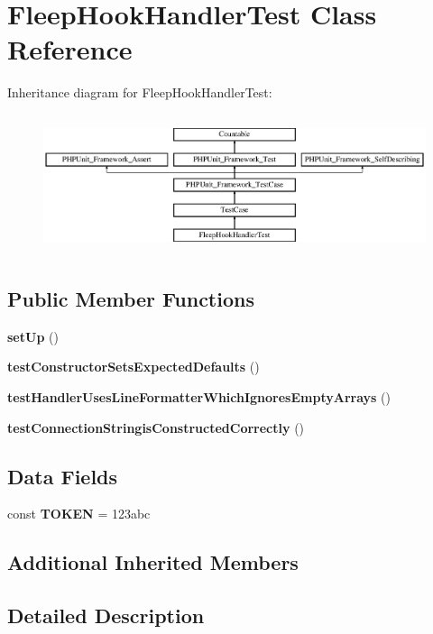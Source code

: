 \section{Fleep\+Hook\+Handler\+Test Class Reference}
\label{class_monolog_1_1_handler_1_1_fleep_hook_handler_test}
Inheritance diagram for Fleep\+Hook\+Handler\+Test\+:\begin{figure}[H]
\begin{center}
\leavevmode
\includegraphics[height=4.129793cm]{class_monolog_1_1_handler_1_1_fleep_hook_handler_test}
\end{center}
\end{figure}
\subsection*{Public Member Functions}
\begin{DoxyCompactItemize}
\item 
{\bf set\+Up} ()
\item 
{\bf test\+Constructor\+Sets\+Expected\+Defaults} ()
\item 
{\bf test\+Handler\+Uses\+Line\+Formatter\+Which\+Ignores\+Empty\+Arrays} ()
\item 
{\bf test\+Connection\+Stringis\+Constructed\+Correctly} ()
\end{DoxyCompactItemize}
\subsection*{Data Fields}
\begin{DoxyCompactItemize}
\item 
const {\bf T\+O\+K\+E\+N} = \textquotesingle{}123abc\textquotesingle{}
\end{DoxyCompactItemize}
\subsection*{Additional Inherited Members}


\subsection{Detailed Description}


